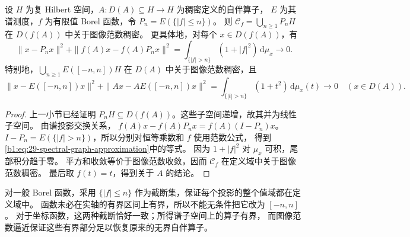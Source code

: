 \begin{proposition}[谱截断的图像范数逼近]
\label{b1:prop:29-spectral-graph-core}
设 \(H\) 为复 Hilbert 空间，\(A:D(A)\subseteq H\to H\) 为稠密定义的自伴算子，
\(E\) 为其谱测度，\(f\) 为有限值 Borel 函数，令 \(P_n=E(\{|f|\le n\})\)。
则 \(\mathcal C_f=\bigcup_{n\ge1}P_nH\) 在 \(D(f(A))\) 中关于图像范数稠密。
更具体地，对每个 \(x\in D(f(A))\)，有
\begin{equation}\label{b1:eq:29-spectral-graph-approximation}
 \|x-P_nx\|^2+
 \|f(A)x-f(A)P_nx\|^2
 =\int_{\{|f|>n\}}(1+|f|^2)\,\mathrm d\mu_x\longrightarrow0.
\end{equation}
特别地，\(\bigcup_{n\ge1}E([-n,n])H\) 在 \(D(A)\) 中关于图像范数稠密，且
\[
 \|x-E([-n,n])x\|^2+
 \|Ax-AE([-n,n])x\|^2
 =\int_{\{|t|>n\}}(1+t^2)\,\mathrm d\mu_x(t)\longrightarrow0
 \quad(x\in D(A)).
\]
\end{proposition}
\begin{proof}
上一小节已经证明 \(P_nH\subseteq D(f(A))\)。这些子空间递增，故其并为线性子空间。
由谱投影交换关系，
\(f(A)x-f(A)P_nx=f(A)(I-P_n)x\)。
\(I-P_n=E(\{|f|>n\})\)，所以分别对恒等乘数和 \(f\) 使用范数公式，
得到\eqref{b1:eq:29-spectral-graph-approximation}中的等式。
因为 \(1+|f|^2\) 对 \(\mu_x\) 可积，尾部积分趋于零。
平方和收敛等价于图像范数收敛，因而 \(\mathcal C_f\) 在定义域中关于图像范数稠密。
最后取 \(f(t)=t\)，得到关于 \(A\) 的结论。
\end{proof}

对一般 Borel 函数，采用 \(\{|f|\le n\}\) 作为截断集，保证每个投影的整个值域都在定义域中。
函数未必在实轴的有界区间上有界，所以不能无条件把它改为 \([-n,n]\)。
对于坐标函数，这两种截断恰好一致；所得谱子空间上的算子有界，
而图像范数逼近保证这些有界部分足以恢复原来的无界自伴算子。
